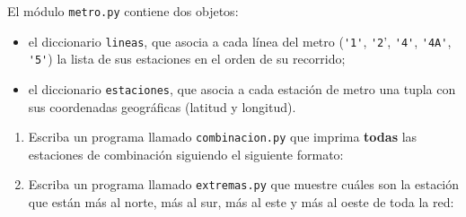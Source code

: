 El módulo \texttt{metro.py} contiene dos objetos:
\begin{itemize}[leftmargin=0pt]
  \item el diccionario \verb!lineas!,
    que asocia a cada línea del metro
    (\verb!'1'!, \verb!'2!', \verb!'4'!, \verb!'4A'!, \verb!'5'!)
    la lista de sus estaciones
    en el orden de su recorrido;
  \item el diccionario \verb!estaciones!,
    que asocia a cada estación de metro
    una tupla con sus coordenadas geográficas
    (latitud y longitud).
\end{itemize}

\begin{enumerate}[leftmargin=0pt,label=\emph{\alph*})]
  \item
    Escriba un programa llamado \texttt{combinacion.py}
    que imprima \textbf{todas} las estaciones de combinación
    siguiendo el siguiente formato:
    

  \item
    Escriba un programa llamado \texttt{extremas.py}
    que muestre cuáles son la estación que están
    más al norte, más al sur, más al este y más al oeste
    de toda la red:
    
\end{enumerate}


